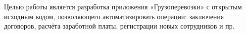 
Целью работы является разработка приложения 
«Грузоперевозки» 
с открытым исходным кодом, 
позволяющего автоматизировать операции: 
заключения договоров, 
расчёта заработной платы, 
регистрации новых сотрудников 
и пр.
